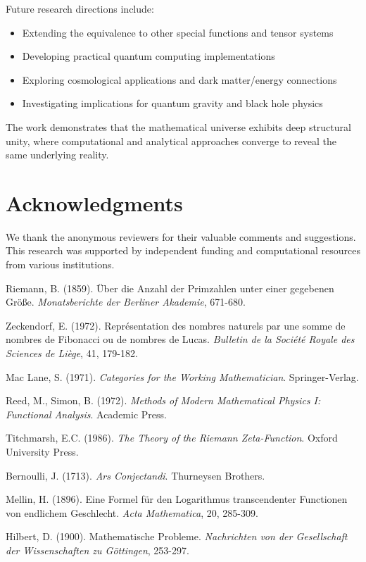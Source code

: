 \documentclass[12pt]{article}
\theoremstyle{plain}
\theoremstyle{definition}
\begin{document}
Future research directions include:
\begin{itemize}
\item Extending the equivalence to other special functions and tensor systems
\item Developing practical quantum computing implementations
\item Exploring cosmological applications and dark matter/energy connections
\item Investigating implications for quantum gravity and black hole physics
\end{itemize}

The work demonstrates that the mathematical universe exhibits deep structural unity, where computational and analytical approaches converge to reveal the same underlying reality.

\section*{Acknowledgments}

We thank the anonymous reviewers for their valuable comments and suggestions. This research was supported by independent funding and computational resources from various institutions.

\begin{thebibliography}{99}

 Riemann, B. (1859). Über die Anzahl der Primzahlen unter einer gegebenen Größe. \emph{Monatsberichte der Berliner Akademie}, 671-680.

 Zeckendorf, E. (1972). Représentation des nombres naturels par une somme de nombres de Fibonacci ou de nombres de Lucas. \emph{Bulletin de la Société Royale des Sciences de Liège}, 41, 179-182.

 Mac Lane, S. (1971). \emph{Categories for the Working Mathematician}. Springer-Verlag.

 Reed, M., Simon, B. (1972). \emph{Methods of Modern Mathematical Physics I: Functional Analysis}. Academic Press.

 Titchmarsh, E.C. (1986). \emph{The Theory of the Riemann Zeta-Function}. Oxford University Press.

 Bernoulli, J. (1713). \emph{Ars Conjectandi}. Thurneysen Brothers.

 Mellin, H. (1896). Eine Formel für den Logarithmus transcendenter Functionen von endlichem Geschlecht. \emph{Acta Mathematica}, 20, 285-309.

 Hilbert, D. (1900). Mathematische Probleme. \emph{Nachrichten von der Gesellschaft der Wissenschaften zu Göttingen}, 253-297.

\end{thebibliography}
\end{document}
